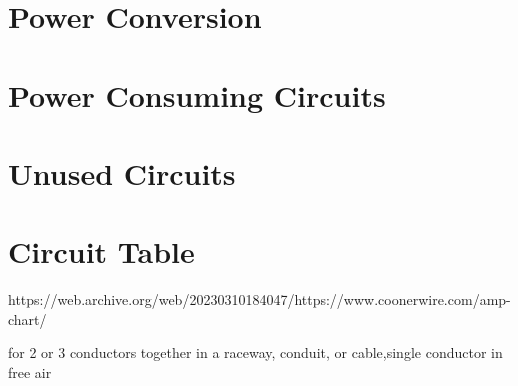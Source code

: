 \section{Power Conversion}

\section{Power Consuming Circuits}

\section{Unused Circuits}

\section{Circuit Table}

    \clearpage



https://web.archive.org/web/20230310184047/https://www.coonerwire.com/amp-chart/

for 2 or 3 conductors together in a raceway, conduit, or cable,single conductor in free air
